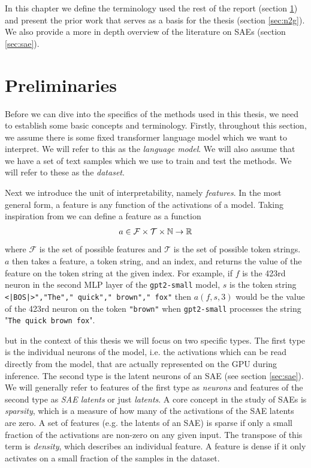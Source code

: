 In this chapter we define the terminology used the rest of the report (section \ref{sec:preliminaries}) and present the prior work that serves as a basis for the thesis (section \ref{sec:n2g}).
We also provide a more in depth overview of the literature on SAEs (section \ref{sec:sae}).

\section{Preliminaries}
\label{sec:preliminaries}
Before we can dive into the specifics of the methods used in this thesis, 
we need to establish some basic concepts and terminology.
Firstly, throughout this section, we assume there is some fixed 
transformer language model \parencite{vaswani_attention_2023} 
which we want to interpret.
We will refer to this as the \emph{language model}.
We will also assume that we have a set of text samples 
which we use to train and test the methods.
We will refer to these as the \emph{dataset}.

Next we introduce the unit of interpretability, namely \emph{features}. 
In the most general form, a feature is any function of the activations 
of a model.
Taking inspiration from \cite{foote_neuron_2023} 
we can define a feature as a function
\begin{align*}
    a\in\mathcal{F}\times\mathcal{T}\times\mathbb{N}\to\mathbb{R}
\end{align*} 
where $\mathcal{F}$ is the set of possible features and
$\mathcal{T}$ is the set of possible token strings.
$a$ then takes a feature, a token string, and an index, and returns 
the value of the feature on the token string at the given index.
For example, if $f$ is the 423rd neuron in the second MLP layer of 
the \texttt{gpt2-small} model, $s$ is the token string 
\texttt{<|BOS|>","The"," quick"," brown"," fox"}
then $a(f,s,3)$ would be the value of the 423rd neuron on the token 
\texttt{"brown"} when \texttt{gpt2-small} processes 
the string "\texttt{The quick brown fox}".


but in the context of this thesis we will focus on two 
specific types.
The first type is the individual neurons of the model, i.e. the activations which can be read directly from the model, that are actually represented on the GPU during inference.
The second type is the latent neurons of an SAE (see section \ref{sec:sae}).
We will generally refer to features of the first type as \emph{neurons} and features of the second type as \emph{SAE latents} or just \emph{latents}.
A core concept in the study of SAEs is \emph{sparsity}, which is a measure of how many of the activations of the SAE latents are zero.
A set of features (e.g. the latents of an SAE) is sparse if only a small fraction of the activations are non-zero on any given input.
The transpose of this term is \emph{density}, which describes an individual feature.
A feature is dense if it only activates on a small fraction of the samples in the dataset.

